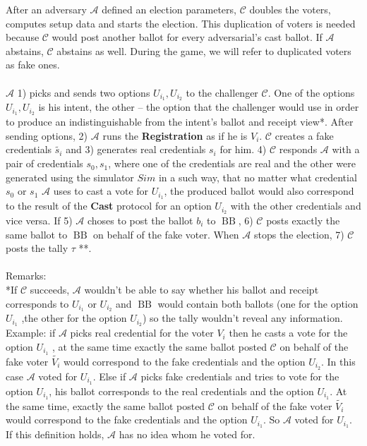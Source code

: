 \documentclass[12pt]{article}
\DeclareMathOperator{\bb}{BB}
\begin{document}
After an adversary  $\mathcal{A}$  defined an election parameters, $\mathcal{C}$  doubles the voters, computes setup data and starts the election. This duplication of voters is needed because $\mathcal{C}$ would post another ballot for every adversarial's cast ballot. If $\mathcal{A}$ abstains, $\mathcal{C}$ abstains as well. During the game, we will refer to duplicated voters as fake ones. \\\\
$\mathcal{A}$ 1) picks and sends two options $U_{i_1},U_{i_2}$ to the challenger $\mathcal{C}$. One of the options $U_{i_1}, U_{i_2}$ is his intent, the other -- the option that the challenger would use in order to produce an indistinguishable from the intent's ballot and receipt view*. After sending options, 2) $\mathcal{A}$ runs the   \textbf{Registration} as if he is $V_i$. $\mathcal{C}$ creates a fake credentials $\tilde{s_i}$ and 3) generates real credentials $s_i$ for him. 4) $\mathcal{C}$ responds $\mathcal{A}$ with a pair of credentials $s_0,s_1$, where one of the credentials are real and the other were generated using the simulator $Sim$ in a such way, that no matter what credential $s_0$ or $s_1$ $\mathcal{A}$ uses to cast a vote for $U_{i_1}$, the produced ballot would also correspond to the result of the \textbf{Cast} protocol for an option $U_{i_2}$ with the other credentials and vice versa. If 5) $\mathcal{A}$ choses to post the ballot $b_i$ to $\bb$, 6) $\mathcal{C}$  posts exactly the same ballot to $\bb$ on behalf of the fake voter. When $\mathcal{A}$ stops the election, 7) $\mathcal{C}$ posts the tally $\tau$ **. \\\\
Remarks:\\
*If  $\mathcal{C}$ succeeds, $\mathcal{A}$ wouldn't be able to say whether his ballot and receipt corresponds to $U_{i_1}$ or $U_{i_2}$ and $\bb$ would contain both ballots (one for the option $U_{i_1}$ ,the other for the option $ U_{i_2}$) so the tally wouldn't reveal any information. Example: if $\mathcal{A}$  picks real credential for the voter $V_i$ then he casts a vote for the option  $U_{i_1}$ , at the same time exactly the same ballot posted $\mathcal{C}$ on behalf of the fake voter $\tilde{V_i}$ would correspond to the fake credentials and the option $U_{i_2}$. In this case $\mathcal{A}$  voted for $U_{i_1}$. Else if $\mathcal{A}$ picks fake credentials and tries to vote for the option $U_{i_1}$,  his ballot corresponds to the real credentials and  the option $U_{i_1}$. At the same time, exactly the same ballot posted $\mathcal{C}$ on behalf of the fake voter $\tilde{V_i}$ would correspond to the fake credentials  and the option $U_{i_1}$. So $\mathcal{A}$  voted for $U_{i_1}$. If this definition holds,  $\mathcal{A}$ has no idea whom he voted for. \\
\end{document}
